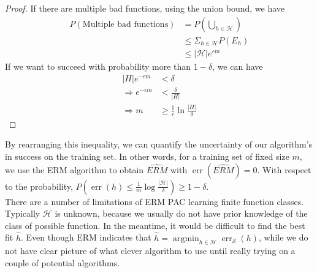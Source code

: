 \begin{proof}

If there are multiple bad functions, using the union bound, we have 
\begin{equation*}
\begin{aligned}
    P(\text{Multiple bad functions}) &= P(\bigcup_{h\in \mathcal{H}})\\
    & \leq \Sigma_{h\in\mathcal{H}}P(E_{h}) \\
    & \leq |\mathcal{H}|e^{\varepsilon m}
\end{aligned}
\end{equation*}
If we want to succeed with probability more than $1- \delta$, we can have
\begin{equation*}
    \begin{aligned}
|H| e^{-\epsilon m} &<\delta \\
\Rightarrow  e^{-\epsilon m} &<\frac{\delta}{|H|} \\
\Rightarrow  m &\geq \frac{1}{\epsilon} \ln \frac{|H|}{\delta}
\end{aligned}
\end{equation*}
\end{proof}

By rearranging this inequality, we can quantify the uncertainty of our algorithm's in success on the training set. In other words,  for a training set of fixed size $m$, we use the ERM algorithm to obtain $\hat{ERM}$ with  $\operatorname{err}(\hat{ERM})=0$. With respect to the probability, $P(\operatorname{err}(h) \leq \frac{1}{m}\log \frac{|\mathcal{H}|}{\delta}) \geq 1-\delta$. \\ 

There are a number of limitations of ERM PAC learning finite function classes. Typically $\mathcal{H}$ is unknown, because we usually do not have prior knowledge of the class of possible function. In the meantime, it would be difficult to find the best fit $\hat{h}$. Even though ERM indicates that $\hat{h} = \operatorname{arg min}_{h \in \mathcal{H}}\operatorname{err}_{\mathcal{S}}(h)$, while we do not have clear picture of what clever algorithm to use until really trying on a couple of potential algorithms. 

